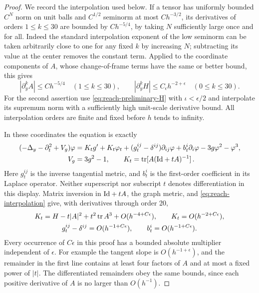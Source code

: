 \begin{proof}
We record the interpolation used below.  If a tensor has uniformly
bounded $C^N$ norm on unit balls and $C^{1/2}$ seminorm at most
$Ch^{-3/2}$, its derivatives of orders $1\le k\le30$ are bounded by
$C h^{-5/4}$, by taking $N$ sufficiently large once and for all.
Indeed the standard interpolation exponent of the low seminorm can
be taken arbitrarily close to one for any fixed $k$ by increasing
$N$; subtracting its value at the center removes the constant term.
Applied to the coordinate components of $A$, whose change-of-frame
terms have the same or better bound, this gives
\begin{equation}\label{eq:reach-interpolation}
 |\partial_y^k A|\le C h^{-5/4}\quad(1\le k\le30),\qquad
 |\partial_y^kH|\le C_\epsilon h^{-2+\epsilon}\quad(0\le k\le30).
\end{equation}
For the second assertion use \eqref{eq:reach-preliminary-H} with
$\iota<\epsilon/2$ and interpolate its supremum norm with a
sufficiently high unit-scale derivative bound.  All interpolation
orders are finite and fixed before $h$ tends to infinity.

In these coordinates the equation is exactly
\begin{equation}\label{eq:C4}
 \begin{split}
 (-\Delta_y-\partial_t^2+V_g)\varphi={}&K_tg'+K_t\varphi_t
 +(g_t^{ij}-\delta^{ij})\partial_{ij}\varphi
 +b_t^i\partial_i\varphi-3g\varphi^2-\varphi^3,\\
 V_g={}&3g^2-1,\qquad
 K_t=\operatorname{tr}[A(\mathrm{Id}+tA)^{-1}]\,.
 \end{split}
\end{equation}
Here $g_t^{ij}$ is the inverse tangential metric, and $b_t^i$ is the
first-order coefficient in its Laplace operator.  Neither superscript
nor subscript $t$ denotes differentiation in this display.  Matrix
inversion in $\mathrm{Id}+tA$, the graph metric, and
\eqref{eq:reach-interpolation} give, with derivatives through order
20,
\begin{equation}\label{eq:reach-coefficients}
 \begin{gathered}
 K_t=H-t|A|^2+t^2\operatorname{tr} A^3+O(h^{-4+C\epsilon}),\qquad
 K_t=O(h^{-2+C\epsilon}),\\
 g_t^{ij}-\delta^{ij}=O(h^{-1+C\epsilon}),\qquad
 b_t^i=O(h^{-1+C\epsilon}).
 \end{gathered}
\end{equation}
Every occurrence of $C\epsilon$ in this proof has a bounded absolute
multiplier independent of $\epsilon$.  For example the tangent slope
is $O(h^{-1+\epsilon})$, and the remainder in the first line contains
at least four factors of $A$ and at most a fixed power of $|t|$.
The differentiated remainders obey the same bounds, since each
positive derivative of $A$ is no larger than $O(h^{-1})$.


\end{proof}

